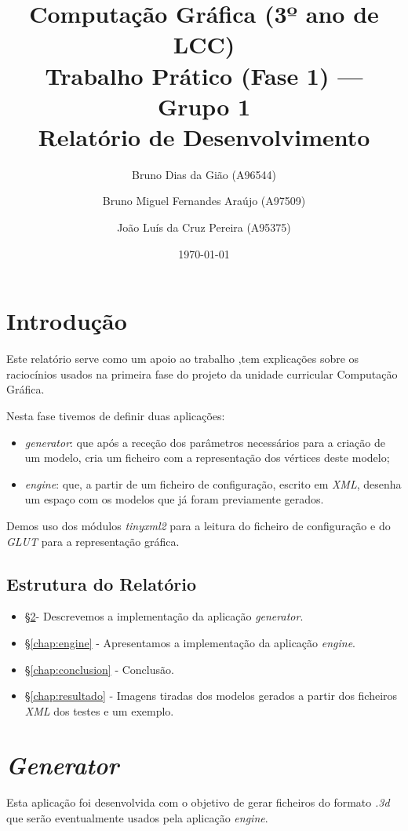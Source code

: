 \documentclass[14pt, a4 paper]{article}
\title{Computação Gráfica (3º ano de LCC)\\
       \textbf{Trabalho Prático (Fase 1) — Grupo 1}\\ Relatório de Desenvolvimento}
\author{ Bruno Dias da Gião  (A96544) 
    \and Bruno Miguel Fernandes Araújo (A97509)
    \and João Luís da Cruz Pereira (A95375)}
\date{\today} %
\begin{document}
\begin{titlepage}
\maketitle
\end{titlepage}

\tableofcontents
\listoffigures
\newpage
\section{Introdução} \label{chap:intro}

Este relatório serve como um apoio ao trabalho ,tem explicações sobre os raciocínios usados na primeira fase do projeto da unidade curricular Computação Gráfica.

Nesta fase tivemos de definir duas aplicações:

\begin{itemize}
\item{\textit{generator}}: que após a receção dos parâmetros necessários para a criação de um modelo, cria um ficheiro com a representação dos vértices deste modelo; 

\item {\textit{engine}}: que, a partir de um ficheiro de configuração, escrito em \textit{XML}, desenha um espaço com os modelos que já foram previamente gerados.
\end{itemize}
Demos uso dos módulos \textit{tinyxml2} para a leitura do ficheiro de configuração e do \textit{GLUT} para a representação gráfica.


\subsection{Estrutura do Relatório}
\begin{itemize}
\item \S\ref{chap:generator}- Descrevemos a implementação da aplicação \textit{generator}.

\item \S\ref{chap:engine} - Apresentamos a implementação da aplicação \textit{engine}. 

\item \S\ref{chap:conclusion} - Conclusão.

\item \S\ref{chap:resultado} - Imagens tiradas dos modelos gerados a partir dos ficheiros \textit{XML} dos testes e um exemplo.
\end{itemize}
\section{\textit{Generator}} \label{chap:generator}
Esta aplicação foi desenvolvida com o objetivo de gerar ficheiros do formato \textit{.3d} que serão eventualmente usados pela aplicação \textit{engine}.
\end{document}
